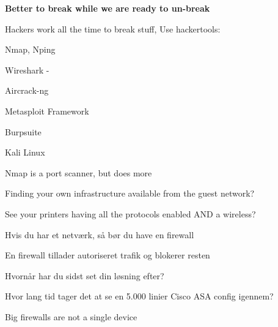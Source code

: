 \documentclass[Screen16to9,17pt]{foils}
\begin{document}
\centerline{\bf Better to break while we are ready to un-break}




\begin{list2}
\item Hackers work all the time to break stuff, Use hackertools:
\item Nmap, Nping 
\item Wireshark - 
\item Aircrack-ng 
\item Metasploit Framework 
\item Burpsuite 
\item Kali Linux 
\end{list2}




\begin{list2}
\item Nmap is a port scanner, but does more
\item Finding your own infrastructure available from the guest network?
\item See your printers having all the protocols enabled AND a wireless?
\end{list2}



\begin{list2}
\item Hvis du har et netværk, så bør du have en firewall
\item En firewall tillader autoriseret trafik og blokerer resten
\item Hvornår har du sidst set din løsning efter?
\item Hvor lang tid tager det at se en 5.000 linier Cisco ASA config igennem?
\end{list2}



\centerline{Big firewalls are not a single device}
\end{document}
